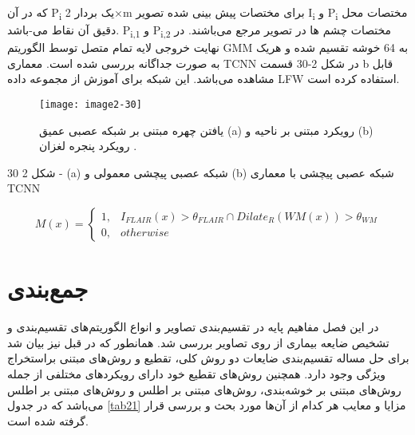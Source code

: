 که در آن
P\textsubscript{i}
یک بردار 2×m برای مختصات پیش بینی شده تصویر
I\textsubscript{i}
و
P\textsubscript{i}
مختصات محل دقیق آن نقاط می-باشد.
P\textsubscript{i,1}
و
P\textsubscript{i,2}
مختصات چشم ها در تصویر مرجع می‌باشند. در نهایت خروجی لایه تمام متصل توسط الگوریتم GMM به 64 خوشه تقسیم شده و هریک به صورت جداگانه بررسی شده است. معماری TCNN در شکل 2-30 قسمت b قابل مشاهده می‌باشد. این شبکه برای آموزش از مجموعه داده LFW استفاده کرده است.
 
 \begin{figure}[h]
\centering
  \texttt{[image: image2-30]}
  \caption{یافتن چهره مبتنی بر شبکه عصبی عمیق (a) رویکرد مبتنی بر ناحیه و (b) رویکرد پنجره لغزان \cite{ref1}.}
  \label{image2-30}
\end{figure}

شکل ‏2 30 - (a) شبکه عصبی پیچشی معمولی و (b) شبکه عصبی پیچشی با معماری TCNN
 

\begin{equation}\label{eq:E2-40}
M(x)= \left\{ \begin{array}{ll}
        1, & I_{FLAIR}(x) > \theta_{FLAIR} \cap Dilate_R(WM(x)) >\theta_{WM}\\
        0, & otherwise \end{array} \right.
\end{equation}


\section{جمع‌بندی}
در این فصل مفاهیم‌ پایه در تقسیم‌بندی تصاویر  و انواع الگوریتم‌های تقسیم‌بندی و تشخیص ضایعه بیماری  از روی تصاویر   بررسی شد. همانطور که در قبل نیز بیان شد برای حل مساله تقسیم‌بندی ضایعات     دو روش کلی، تقطیع و  روش‌های مبتنی براستخراج ویژگی وجود دارد. همچنین روش‌های تقطیع خود دارای رویکردهای مختلفی از جمله روش‌های مبتنی بر خوشه‌بندی، روش‌های مبتنی بر اطلس و روش‌های مبتنی بر اطلس می‌باشد  که در جدول \ref{tab21} مزایا و معایب هر کدام از آن‌ها مورد بحث و بررسی قرار گرفته شده است.